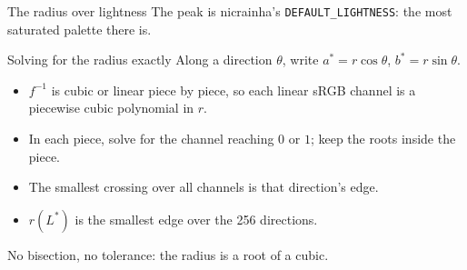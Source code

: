 \begin{slide}{The radius over lightness}
  The peak is nicrainha's \texttt{DEFAULT\_LIGHTNESS}: the most saturated
  palette there is.
\end{slide}

\begin{slide}{Solving for the radius exactly}
  Along a direction $\theta$, write $a^* = r\cos\theta$, $b^* = r\sin\theta$.
  \begin{itemize}
    \item $f^{-1}$ is cubic or linear piece by piece, so each linear sRGB
      channel is a piecewise cubic polynomial in $r$.
    \item In each piece, solve for the channel reaching $0$ or $1$; keep the
      roots inside the piece.
    \item The smallest crossing over all channels is that direction's edge.
    \item $r(L^*)$ is the smallest edge over the 256 directions.
  \end{itemize}
  No bisection, no tolerance: the radius is a root of a cubic.
\end{slide}

